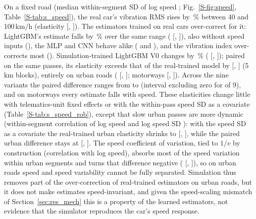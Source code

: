 On a fixed road (median within-segment SD of log speed \elSdLogv; Fig.~\ref{S-fig:speed}, Table~\ref{S-tab:s_speed}), the real car's vibration RMS rises by \elRawPooledPct\,\% between 40 and 100\,km/h (elasticity \elRawPooled{} [\elRawPooledLo, \elRawPooledHi]).
The estimators trained on real cars over-correct for it: LightGBM's estimate falls by \elRealGbmPooledPct\,\% over the same range (\elRealGbmPooled{} [\elRealGbmPooledLo, \elRealGbmPooledHi]), also without speed inputs (\elRealGbmNoSpeedPooled), the MLP and CNN behave alike (\elRealMlpPooled{} and \elRealCnnPooled), and the vibration index over-corrects most (\elRealIdxPooled).
Simulation-trained LightGBM V0 changes by \elSimGbmPooledPct\,\% (\elSimGbmPooled{} [\elSimGbmPooledLo, \elSimGbmPooledHi]); paired on the same passes, its elasticity exceeds that of the real-trained model by \epVzeroPooled{} [\epVzeroPooledLo, \epVzeroPooledHi] (5\,km blocks), entirely on urban roads (\epVzeroUrban{} [\epVzeroUrbanLo, \epVzeroUrbanHi]; motorways \epVzeroMotorway{} [\epVzeroMotorwayLo, \epVzeroMotorwayHi]).
Across the nine variants the paired difference ranges from \epMeasPooledMin{} to \epMeasPooledMax{} (interval excluding zero for \epMeasPooledExcl{} of 9), and on motorways every estimate falls with speed.
These elasticities change little with telematics-unit fixed effects or with the within-pass speed SD as a covariate (Table~\ref{S-tab:s_speed_rob}), except that slow urban passes are more dynamic (within-segment correlation of log speed and log speed SD \srCorrLsdUrban): with the speed SD as a covariate the real-trained urban elasticity shrinks to \srRealUrbanLsd{} [\srRealUrbanLsdLo, \srRealUrbanLsdHi], while the paired urban difference stays at \srDiffUrbanLsd{} [\srDiffUrbanLsdLo, \srDiffUrbanLsdHi].
The speed coefficient of variation, tied to $1/v$ by construction (correlation \srCorrCvUrban{} with log speed), absorbs most of the speed variation within urban segments and turns that difference negative (\srDiffUrbanCv{} [\srDiffUrbanCvLo, \srDiffUrbanCvHi]), so on urban roads speed and speed variability cannot be fully separated.
Simulation thus removes part of the over-correction of real-trained estimators on urban roads, but it does not make estimates speed-invariant, and given the speed-scaling mismatch of Section~\ref{sec:res_mech} this is a property of the learned estimators, not evidence that the simulator reproduces the car's speed response.
